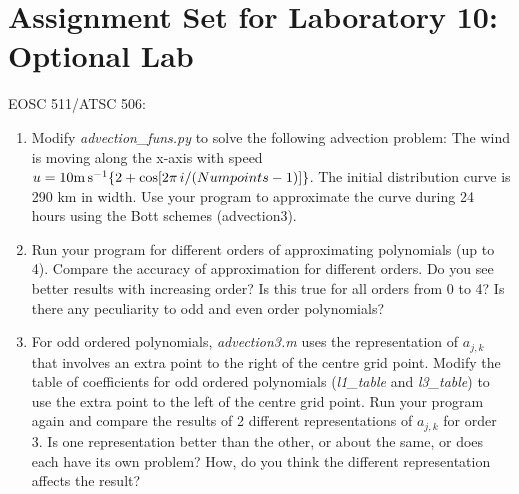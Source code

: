 \documentclass[12pt]{article}
\begin{document}
\section*{Assignment Set for Laboratory 10: Optional Lab}

EOSC 511/ATSC 506: 

 \begin{enumerate}
\item Modify {\em advection\_funs.py} to solve the following advection
  problem:  The wind is moving along the x-axis with speed \\ $u = 10
  {\rm m\,s}^{-1} \{2 + \cos[2 \pi\,i/(Numpoints-1)]\}$.  The initial
  distribution curve is 290 km in width.  Use your program to
  approximate the curve during 24 hours using the Bott schemes (advection3).

\item Run your program for different orders of approximating polynomials
(up to 4).
Compare the accuracy of approximation for different orders.
Do you see better results with increasing order? Is this true for all
orders from 0 to 4? Is there any peculiarity to odd and even order
polynomials?

\item For odd ordered polynomials, \textit{advection3.m} uses the representation
of $a_{j,k}$ that involves an
extra point to the right of the centre grid point. Modify the table
of coefficients for odd ordered polynomials (\textit{l1\_table} and
\textit{l3\_table}) to use the extra point to the left of the centre
grid point. Run your program again and compare the results of 2 different
representations of  $a_{j,k}$ for order 3. Is one representation better than the other, or about the same, or does each have its own problem? How, do you think
the different representation affects the result?  

\end{enumerate}
\end{document}
